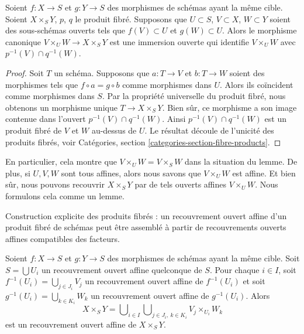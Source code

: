 \begin{lemma}
\label{lemma-open-fibre-product}
Soient $f : X \to S$ et $g : Y \to S$ des morphismes de schémas
ayant la même cible. Soient $X \times_S Y$, $p$, $q$ le produit fibré.
Supposons que $U \subset S$, $V
\subset X$, $W \subset Y$ soient des sous-schémas
ouverts tels que $f(V) \subset U$ et $g(W) \subset
U$. Alors le morphisme canonique
$V \times_U W \to X \times_S Y$ est une immersion
ouverte qui identifie $V \times_U W$ avec $p^{-1}(V) \cap q^{-1}(W)$.
\end{lemma}

\begin{proof}
Soit $T$ un schéma.
Supposons que $a : T \to V$ et $b : T \to W$ soient des
morphismes tels que $f \circ a = g \circ b$ comme morphismes dans
$U$. Alors ils coïncident comme morphismes
dans $S$. Par la propriété universelle du produit fibré,
nous obtenons un morphisme unique $T \to X \times_S Y$. Bien sûr, ce
morphisme a son image contenue dans l'ouvert $p^{-1}(V) \cap
q^{-1}(W)$. Ainsi $p^{-1}(V) \cap q^{-1}(W)$ est un produit
fibré de $V$ et $W$ au-dessus de $U$. Le résultat découle de l'unicité
des produits fibrés, voir Catégories, section
\ref{categories-section-fibre-products}.
\end{proof}

\noindent
En particulier, cela montre que $V \times_U W = V \times_S W$ dans
la situation du lemme. De plus, si $U, V, W$ sont tous affines, alors
nous savons que $V \times_U W$ est affine. Et bien sûr, nous pouvons
recouvrir $X \times_S Y$ par de tels ouverts affines $V \times_U W$. Nous
formulons cela comme un lemme.

\begin{lemma}
\label{lemma-affine-covering-fibre-product}
\begin{slogan}
Construction explicite des produits fibrés : un recouvrement ouvert affine d'un
produit fibré de schémas peut être assemblé à partir de recouvrements
ouverts affines compatibles des facteurs.
\end{slogan}
Soient $f : X \to S$ et $g : Y \to S$ des morphismes de schémas
ayant la même cible. Soit $S = \bigcup U_i$ un recouvrement ouvert
affine quelconque de $S$. Pour chaque $i \in I$,
soit $f^{-1}(U_i) = \bigcup_{j \in J_i} V_j$ un recouvrement ouvert
affine de $f^{-1}(U_i)$ et
soit $g^{-1}(U_i) = \bigcup_{k \in K_i} W_k$ un recouvrement ouvert affine
de $g^{-1}(U_i)$. Alors
$$
X \times_S Y =
\bigcup\nolimits_{i \in I}
\bigcup\nolimits_{j \in J_i, \ k \in K_i}
V_j \times_{U_i} W_k
$$
est un recouvrement ouvert affine de $X \times_S Y$.
\end{lemma}

